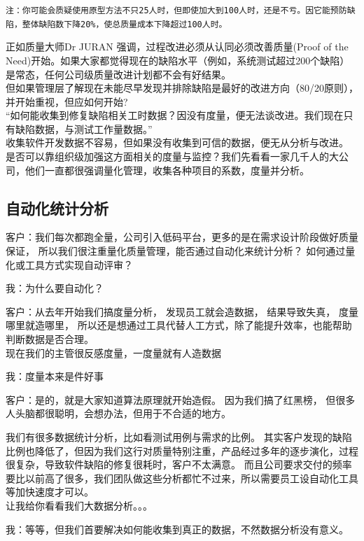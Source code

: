 \texttt{注：你可能会质疑使用原型方法不只25人时，但即使加大到100人时，还是不亏。因它能预防缺陷，整体缺陷数下降20\%，使总质量成本下降超过100人时。}

正如质量大师Dr JURAN 强调，过程改进必须从认同必须改善质量(Proof of the
Need)开始。如果大家都觉得现在的缺陷水平（例如，系统测试超过200个缺陷）是常态，任何公司级质量改进计划都不会有好结果。\\
但如果管理层了解现在未能尽早发现并排除缺陷是最好的改进方向（80/20原则），并开始重视，但应如何开始?\\
``如何能收集到修复缺陷相关工时数据？因没有度量，便无法谈改进。我们现在只有缺陷数据，与测试工作量数据。''\\
收集软件开发数据不容易，但如果没有收集到可信的数据，便无从分析与改进。\\
是否可以靠组织级加强这方面相关的度量与监控？我们先看看一家几千人的大公司，他们一直都很强调量化管理，收集各种项目的系数，度量并分析。\\

\hypertarget{ux81eaux52a8ux5316ux7edfux8ba1ux5206ux6790}{%
\subsection{自动化统计分析}\label{ux81eaux52a8ux5316ux7edfux8ba1ux5206ux6790}}

客户：我们每次都跑全量，公司引入低码平台，更多的是在需求设计阶段做好质量保证，
所以我们很注重量化质量管理，能否通过自动化来统计分析？
如何通过量化或工具方式实现自动评审？

我：为什么要自动化？

客户：从去年开始我们搞度量分析， 发现员工就会造数据， 结果导致失真，
度量哪里就造哪里，
所以还是想通过工具代替人工方式，除了能提升效率，也能帮助判断数据是否合理。\\
现在我们的主管很反感度量，一度量就有人造数据

我：度量本来是件好事

客户：是的，就是大家知道算法原理就开始造假。 因为我们搞了红黑榜，
但很多人头脑都很聪明，会想办法，但用于不合适的地方。

我们有很多数据统计分析，比如看测试用例与需求的比例。
其实客户发现的缺陷比例也降低了，但因为我们这行对质量特别注重，产品经过多年的逐步演化，过程很复杂，导致软件缺陷的修复很耗时，客户不太满意。
而且公司要求交付的频率要比以前高了很多，我们团队做这些分析都忙不过来，所以需要员工设自动化工具等加快速度才可以。\\
让我给你看看我们大数据分析。。。

我：等等，但我们首要解决如何能收集到真正的数据，不然数据分析没有意义。

